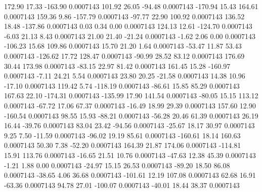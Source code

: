       172.90       17.33     -163.90     0.0007143
      101.92       26.05      -94.48     0.0007143
     -170.94       15.43      164.61     0.0007143
      159.36        9.86     -157.79     0.0007143
      -97.77       22.90      100.92     0.0007143
      136.52       18.48     -137.86     0.0007143
        0.03        0.34        0.00     0.0007143
      124.13       12.61     -124.70     0.0007143
       -6.03       21.13        8.43     0.0007143
       21.00       21.40      -21.24     0.0007143
       -1.62        2.06        0.00     0.0007143
     -106.23       15.68      109.86     0.0007143
       15.70       21.20        1.64     0.0007143
      -53.47       11.87       53.43     0.0007143
     -126.62       17.72      128.47     0.0007143
      -90.99       28.52       83.12     0.0007143
      176.69       30.44      173.98     0.0007143
      -83.15       22.97       81.42     0.0007143
      161.45       15.28     -160.97     0.0007143
       -7.11       24.21        5.54     0.0007143
       23.80       20.25      -21.58     0.0007143
       14.38       10.96      -17.10     0.0007143
      119.42        5.74     -118.19     0.0007143
      -86.61       15.85       85.29     0.0007143
      167.63       22.10     -174.31     0.0007143
     -135.99       17.90      141.54     0.0007143
      -80.05       15.15      113.12     0.0007143
      -67.72       17.06       67.37     0.0007143
      -16.49       18.99       29.39     0.0007143
      157.60       12.90     -160.54     0.0007143
       98.55       15.93      -88.21     0.0007143
      -56.28       20.46       61.39     0.0007143
       26.19       16.44      -39.76     0.0007143
       83.04       23.42      -94.56     0.0007143
      -25.67       18.17       30.97     0.0007143
        9.25        7.50      -11.59     0.0007143
      -96.02       19.19       85.61     0.0007143
     -160.61       18.14      160.63     0.0007143
       50.30        7.38      -52.20     0.0007143
      164.39       21.87      174.06     0.0007143
     -114.81       15.91      113.76     0.0007143
      -16.65       21.51       10.76     0.0007143
      -47.63       12.38       45.39     0.0007143
       -1.21        1.88        0.00     0.0007143
      -24.97       15.15       26.53     0.0007143
      -89.20       18.50       86.08     0.0007143
      -38.65        4.06       36.68     0.0007143
     -101.61       12.19      107.08     0.0007143
       62.68       16.91      -63.36     0.0007143
       94.78       27.01     -100.07     0.0007143
      -40.01       18.44       38.37     0.0007143
